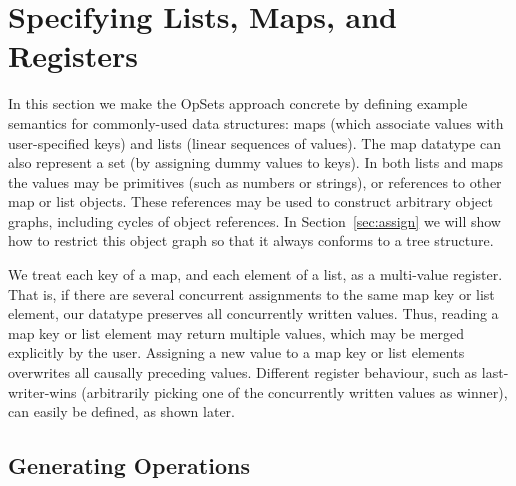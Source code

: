 \section{Specifying Lists, Maps, and Registers}\label{sec:list}

In this section we make the OpSets approach concrete by defining example semantics for commonly-used data structures: maps (which associate values with user-specified keys) and lists (linear sequences of values).
The map datatype can also represent a set (by assigning dummy values to keys).
In both lists and maps the values may be primitives (such as numbers or strings), or references to other map or list objects.
These references may be used to construct arbitrary object graphs, including cycles of object references.
In Section~\ref{sec:assign} we will show how to restrict this object graph so that it always conforms to a tree structure.

We treat each key of a map, and each element of a list, as a multi-value register.
That is, if there are several concurrent assignments to the same map key or list element, our datatype preserves all concurrently written values.
Thus, reading a map key or list element may return multiple values, which may be merged explicitly by the user.
Assigning a new value to a map key or list elements overwrites all causally preceding values.
Different register behaviour, such as last-writer-wins (arbitrarily picking one of the concurrently written values as winner), can easily be defined, as shown later.

\subsection{Generating Operations}

